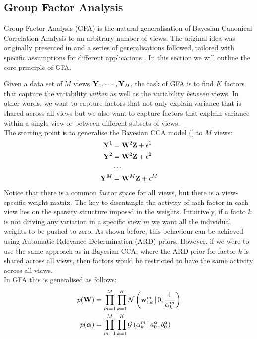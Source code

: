 \subsection{Group Factor Analysis} \label{section:gfa}

Group Factor Analysis (GFA) is the natural generalisation of Bayesian Canonical Correlation Analysis to an arbitrary number of views.
The original idea was originally presented in \cite{Virtanen2012} and a series of generalisations followed, tailored with specific assumptions for different applications \cite{Klami2015,Leppaaho2017,Bunte2016,Khan2014,Zhao2016,Remes2015}. In this section we will outline the core principle of GFA.

Given a data set of $M$ views ${\bf Y}_1, \cdots, {\bf Y}_M$, the task of GFA is to find $K$ factors that capture the variability \textit{within} as well as the variability \textit{between} views. In other words, we want to capture factors that not only explain variance that is shared across all views but we also want to capture factors that explain variance within a single view or between different subsets of views.\\
The starting point is to generalise the Bayesian CCA model () to $M$ views:
\begin{align*}
	{\bf Y}^{1} &= {\bf W}^{2} {\bf Z} + \epsilon^{1} \\
	{\bf Y}^{2} &= {\bf W}^{2} {\bf Z} + \epsilon^{2} \\
	& \cdots \\
	{\bf Y}^{M} &= {\bf W}^{M} {\bf Z} + \epsilon^{M}
\end{align*}
Notice that there is a common factor space for all views, but there is a view-specific weight matrix. The key to disentangle the activity of each factor in each view lies on the sparsity structure imposed in the weights. Intuitively, if a facto $k$ is not driving any variation in a specific view $m$ we want all the individual weights to be pushed to zero. As shown before, this behaviour can be achieved using Automatic Relevance Determination (ARD) priors. However, if we were to use the same approach as in Bayesian CCA, where the ARD prior for factor $k$ is shared across all views, then factors would be restricted to have the same activity across all views.\\
In GFA this is generalised as follows:
\begin{align}
	p({\bf W}) &= \prod_{m=1}^{M} \prod_{k=1}^{K} \mathcal{N}\left({\bf w}_{:,k}^m \,|\, 0,\frac{1}{\alpha_k^m}\right) \\
	p(\mbox{\boldmath $\alpha$}) &= \prod_{m=1}^{M} \prod_{k=1}^{K} \mathcal{G}\left(\alpha_k^m \,|\, a_0^\alpha, b_0^\alpha\right)
\end{align}
